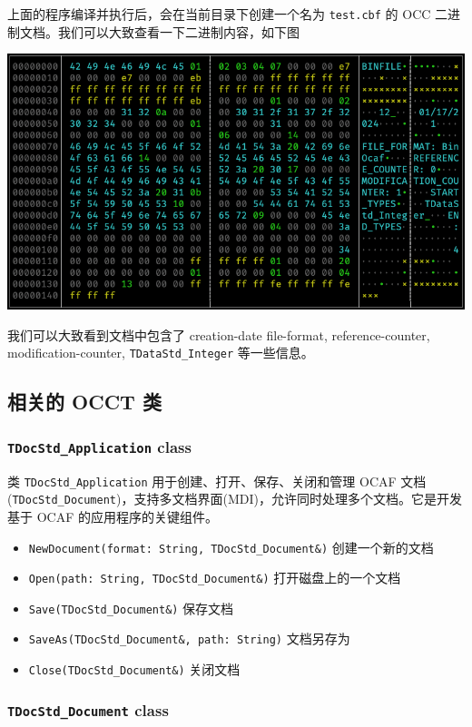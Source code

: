 \documentclass[11pt]{article}
\begin{document}
上面的程序编译并执行后，会在当前目录下创建一个名为 \texttt{test.cbf} 的 OCC 二进制文档。我们可以大致查看一下二进制内容，如下图

\begin{center}
\includegraphics[width=.9\linewidth]{./img/binocaf-binary-content.png}
\end{center}

我们可以大致看到文档中包含了 creation-date file-format, reference-counter, modification-counter, \texttt{TDataStd\_Integer} 等一些信息。
\subsection{相关的 OCCT 类}
\label{sec:orgeaf4d6e}

\subsubsection{\texttt{TDocStd\_Application} class}
\label{sec:org7d58ba6}

类 \texttt{TDocStd\_Application} 用于创建、打开、保存、关闭和管理 OCAF 文档(\texttt{TDocStd\_Document})，支持多文档界面(MDI)，允许同时处理多个文档。它是开发基于 OCAF 的应用程序的关键组件。

\begin{itemize}
\item \texttt{NewDocument(format: String, TDocStd\_Document\&)} 创建一个新的文档
\item \texttt{Open(path: String, TDocStd\_Document\&)} 打开磁盘上的一个文档
\item \texttt{Save(TDocStd\_Document\&)} 保存文档
\item \texttt{SaveAs(TDocStd\_Document\&, path: String)} 文档另存为
\item \texttt{Close(TDocStd\_Document\&)} 关闭文档
\end{itemize}
\subsubsection{\texttt{TDocStd\_Document} class}
\label{sec:org42bfee5}
\end{document}
